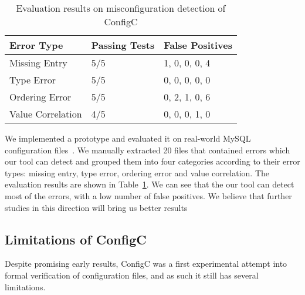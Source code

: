 \fi 


\begin{table}[h]
\centering
\caption{Evaluation results on misconfiguration detection of ConfigC}
\label{table:res}
\begin{tabular}{|l|l|l|}
\hline
Error Type       & Passing Tests & False Positives  \\ 
\hline
\hline
Missing Entry      & 5/5           & 1, 0, 0, 0, 4        \\ \hline
Type Error         & 5/5           & 0, 0, 0, 0, 0          \\ \hline
Ordering Error     & 5/5           & 0, 2, 1, 0, 6       \\ \hline
Value Correlation  & 4/5           & 0, 0, 0, 1, 0        \\ 
\hline
\end{tabular}
\end{table}

We implemented a prototype and evaluated it on 
real-world MySQL configuration files~\cite{configdataset}.
We manually extracted 20 files that contained errors which our tool 
can detect and grouped them into four categories according to their
error types: missing entry, type error, ordering error
and value correlation. The evaluation results are shown in 
Table~\ref{table:res}. We can see that the our tool can detect most of 
the errors, with a low number of false positives. We believe that further
studies in this direction will bring us better results

\subsection{Limitations of ConfigC}
Despite promising early results, ConfigC was a first experimental attempt 
into formal verification of configuration files, and as such it still has several limitations.

